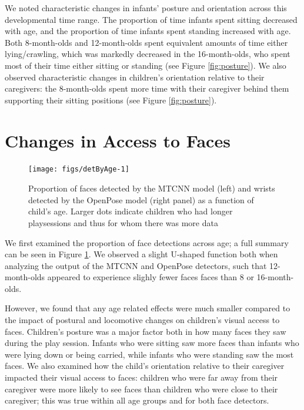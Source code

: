 \documentclass[10pt, letterpaper]{article}
\newenvironment{CodeChunk}{}{}
\begin{document}
We noted characteristic changes in infants' posture and orientation
across this developmental time range. The proportion of time infants
spent sitting decreased with age, and the proportion of time infants
spent standing increased with age. Both 8-month-olds and 12-month-olds
spent equivalent amounts of time either lying/crawling, which was
markedly decreased in the 16-month-olds, who spent most of their time
either sitting or standing (see Figure \ref{fig:posture}). We also
observed characteristic changes in children's orientation relative to
their caregivers: the 8-month-olds spent more time with their caregiver
behind them supporting their sitting positions (see Figure
\ref{fig:posture}).

\section{Changes in Access to Faces}\label{changes-in-access-to-faces}

\begin{CodeChunk}
\begin{figure}[h]

{\centering \texttt{[image: figs/detByAge-1]} 

}

\caption[Proportion of faces detected by the MTCNN model (left) and wrists detected by the OpenPose model (right panel) as a function of child's age]{Proportion of faces detected by the MTCNN model (left) and wrists detected by the OpenPose model (right panel) as a function of child's age. Larger dots indicate children who had longer playsessions and thus for whom there was more data}\label{fig:detByAge}
\end{figure}
\end{CodeChunk}

We first examined the proportion of face detections across age; a full
summary can be seen in Figure \ref{fig:detByAge}. We observed a slight
U-shaped function both when analyzing the output of the MTCNN and
OpenPose detectors, such that 12-month-olds appeared to experience
slighly fewer faces faces than 8 or 16-month-olds.

However, we found that any age related effects were much smaller
compared to the impact of postural and locomotive changes on children's
visual access to faces. Children's posture was a major factor both in
how many faces they saw during the play session. Infants who were
sitting saw more faces than infants who were lying down or being
carried, while infants who were standing saw the most faces. We also
examined how the child's orientation relative to their caregiver
impacted their visual access to faces: children who were far away from
their caregiver were more likely to see faces than children who were
close to their caregiver; this was true within all age groups and for
both face detectors.
\end{document}
